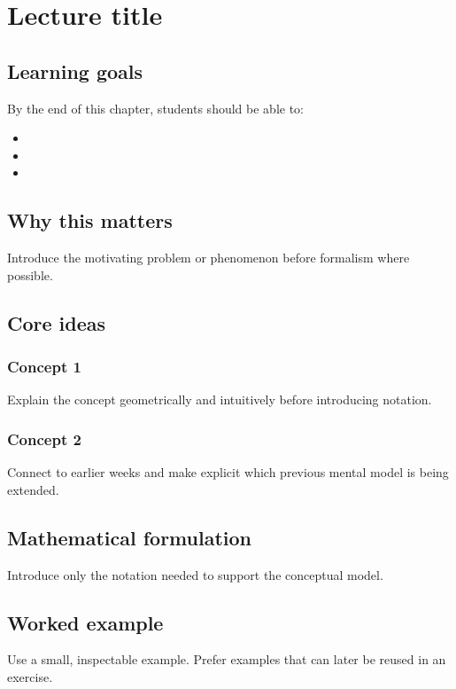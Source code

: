 
\chapter{Lecture title}
\label{chap:weekXX}

\section{Learning goals}
By the end of this chapter, students should be able to:
\begin{itemize}
  \item 
  \item 
  \item 
\end{itemize}

\section{Why this matters}
Introduce the motivating problem or phenomenon before formalism where possible.

\section{Core ideas}

\subsection{Concept 1}
Explain the concept geometrically and intuitively before introducing notation.

\subsection{Concept 2}
Connect to earlier weeks and make explicit which previous mental model is being extended.

\section{Mathematical formulation}
Introduce only the notation needed to support the conceptual model.

\section{Worked example}
Use a small, inspectable example. Prefer examples that can later be reused in an exercise.

